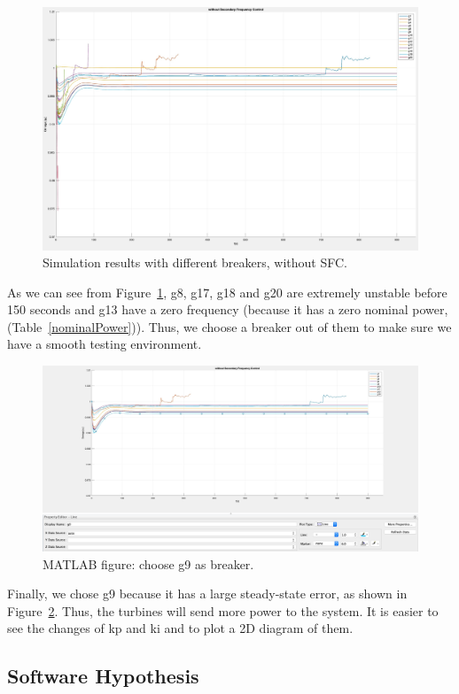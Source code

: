 \begin{figure}[htbp]
\centering
\includegraphics[width = .891\textwidth]{figure/4_1_1_without1.jpeg}
\caption{Simulation results with different breakers, without SFC.}
\label{4_1_1_without1}
\end{figure}

As we can see from Figure~\ref{4_1_1_without1}, g8, g17, g18 and g20 are extremely unstable before 150 seconds and g13 have a zero frequency (because it has a zero nominal power, (Table~\ref{nominalPower})). Thus, we choose a breaker out of them to make sure we have a smooth testing environment. 


\begin{figure}[htbp]
\centering
\includegraphics[width = .891\textwidth]{figure/4_1_1_without2.jpeg}
\caption{MATLAB figure: choose g9 as breaker.}
\label{4_1_1_without2}
\end{figure}

Finally, we chose g9 because it has a large steady-state error, as shown in Figure~\ref{4_1_1_without2}. Thus, the turbines will send more power to the system. It is easier to see the changes of kp and ki and to plot a 2D diagram of them.

\subsection{Software Hypothesis} %

